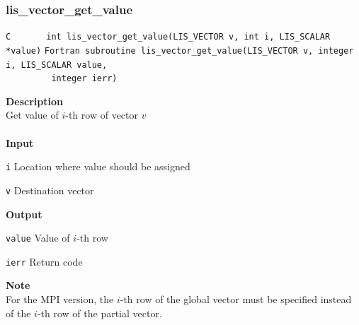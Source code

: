 \documentclass[a4paper]{article}
\newcommand{\namelistlabel}[1]{\mbox{#1}\hfill}
\newenvironment{namelist}[1]{%
 \begin{list}{}
  {\let\makelabel\namelistlabel
  \settowidth{\labelwidth}{#1}
  \setlength{\leftmargin}{1.1\labelwidth}}
}{%
\end{list}}
\begin{document}
  \subsubsection{lis\_vector\_get\_value}
\begin{screen}
\verb|C       int lis_vector_get_value(LIS_VECTOR v, int i, LIS_SCALAR *value)|
\verb|Fortran subroutine lis_vector_get_value(LIS_VECTOR v, integer i, LIS_SCALAR value,|\\
\verb|         integer ierr)|
\end{screen}
{\bf Description}\\
\indent
Get value of $i$-th row of vector $v$
\\ \\
\noindent
{\bf Input}
\begin{namelist}{XXXXXXXXXXXXXXXXXXXX}
\item[\tt i] Location where value should be assigned
\item[\tt v] Destination vector
\end{namelist}
{\bf Output}
\begin{namelist}{XXXXXXXXXXXXXXXXXXXX}
\item[\tt value] Value of $i$-th row
\item[\tt ierr] Return code
\end{namelist}
{\bf Note}\\
\indent
For the MPI version, the $i$-th row of the global vector must be
specified instead of  
the $i$-th row of the partial vector.
\end{document}
